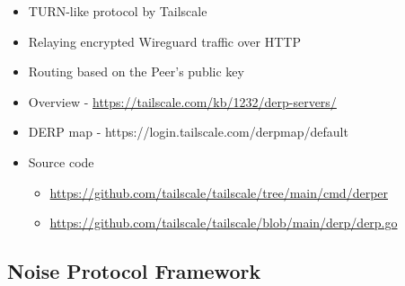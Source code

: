 \begin{itemize}
\tightlist
\item
  TURN-like protocol by Tailscale
\item
  Relaying encrypted Wireguard traffic over HTTP
\item
  Routing based on the Peer's public key
\item
  Overview - \url{https://tailscale.com/kb/1232/derp-servers/}
\item
  DERP map - https://login.tailscale.com/derpmap/default
\item
  Source code

  \begin{itemize}
  \tightlist
  \item
    \url{https://github.com/tailscale/tailscale/tree/main/cmd/derper}
  \item
    \url{https://github.com/tailscale/tailscale/blob/main/derp/derp.go}
  \end{itemize}
\end{itemize}

\hypertarget{noise-protocol-framework}{%
\subsection{Noise Protocol Framework}\label{noise-protocol-framework}}

